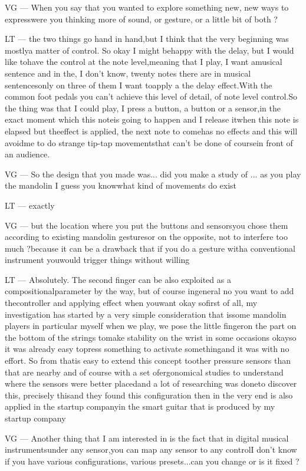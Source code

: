 VG — When you say that you wanted to explore something new, new ways to expresswere you thinking more of sound, or gesture, or a little bit of both ?

LT — the two things go hand in hand,but I think that the very beginning was mostlya matter of control. So okay I might behappy with the delay, but I would like tohave the control at the note level,meaning that I play, I want amusical sentence and in the, I don't know, twenty notes there are in musical sentencesonly on three of them I want toapply a the delay effect.With the common foot pedals you can't achieve this level of detail, of note level control.So the thing was that I could play, I press a button, a button or a sensor,in the exact moment which this noteis going to happen and I release itwhen this note is elapsed but theeffect is applied, the next note to comehas no effects and this will avoidme to do strange tip-tap movementsthat can't be done of coursein front of an audience.

VG — So the design that you made was... did you make a study of ... as you play the mandolin I guess you knowwhat kind of movements do exist 

LT — exactly

VG — but the location where you put the buttons and sensorsyou chose them according to existing mandolin gesturesor on the opposite, not to interfere too much ?because it can be a drawback that if you do a gesture witha conventional instrument youwould trigger things without willing

LT — Absolutely. The second finger can be also exploited as a compositionalparameter by the way, but of course ingeneral no you want to add thecontroller and applying effect when youwant okay sofirst of all, my investigation has started by a very simple consideration that issome mandolin players in particular myself when we play, we pose the little fingeron the part on the bottom of the strings tomake stability on the wrist in some occasions okayso it was already easy topress something to activate somethingand it was with no effort. So from thatis easy to extend this concept toother pressure sensors than that are nearby and of course with a set ofergonomical studies to understand where the sensors were better placedand a lot of researching was doneto discover this, precisely thisand they found this configuration then in the very end is also applied in the startup companyin the smart guitar that is produced by my startup company

VG — Another thing that I am interested in is the fact that in digital musical instrumentsunder any sensor,you can map any sensor to any controlI don't know if you have various configurations, various presets...can you change or is it fixed ?

